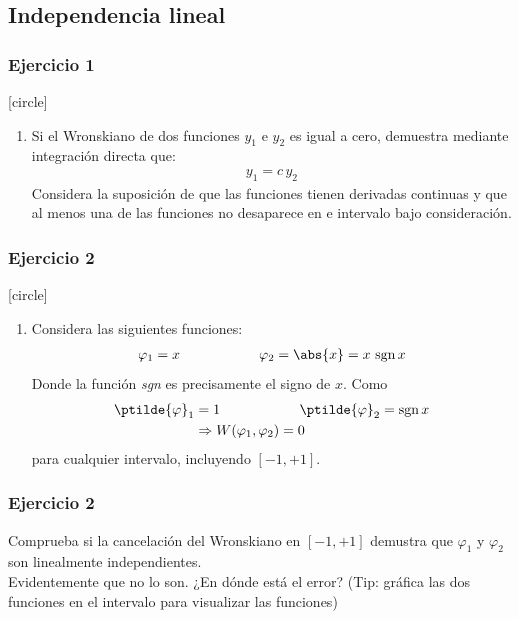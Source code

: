 \subsection{Independencia lineal}
\begin{frame}
\frametitle{Ejercicio 1}
[circle]
\begin{enumerate}
\item Si el Wronskiano de dos funciones $y_{1}$ e $y_{2}$ es igual a cero, demuestra mediante integración directa que:
\begin{align*}
y_{1} = c \, y_{2}
\end{align*}
Considera la suposición de que las funciones tienen derivadas continuas y que al menos una de las funciones no desaparece en e intervalo bajo consideración.
\seti
\end{enumerate}
\end{frame}
\begin{frame}
\frametitle{Ejercicio 2}
[circle]
\begin{enumerate}
\conti    
\item Considera las siguientes funciones:
\begin{align*}
\varphi_{1} =  x \hspace{2cm} \varphi_{2} = \abs{x} = x \, \, \mbox{sgn} \, x
\end{align*}
Donde la función \textit{sgn} es precisamente el signo de $x$. Como 
\begin{align*}
\ptilde{\varphi}_{1} &=  1 \hspace{2cm} \ptilde{\varphi}_{2} = \mbox{sgn} \, x \\
&\Rightarrow W(\varphi_{1}, \varphi_{2}) = 0
\end{align*}
para cualquier intervalo, incluyendo $[-1, +1]$.
\seti
\end{enumerate}
\end{frame}
\begin{frame}
\frametitle{Ejercicio 2}
Comprueba si la cancelación del Wronskiano en $[-1, +1]$ demustra que $\varphi_{1}$ y $\varphi_{2}$ son linealmente independientes.
\\
\bigskip
Evidentemente que no lo son. ¿En dónde está el error? (Tip: gráfica las dos funciones en el intervalo para visualizar las funciones)
\end{frame}
